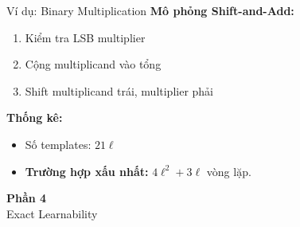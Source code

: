 \begin{frame}{Ví dụ: Binary Multiplication}
  \textbf{Mô phỏng Shift-and-Add:}
  \begin{enumerate}
    \item Kiểm tra LSB multiplier
    \item Cộng multiplicand vào tổng
    \item Shift multiplicand trái, multiplier phải
  \end{enumerate}

  \vspace{0.3cm}
  \textbf{Thống kê:}
  \begin{itemize}
    \item Số templates: $21\ell$
       \item \textbf{Trường hợp xấu nhất:} $4\ell^2 + 3\ell$ vòng lặp.

  \end{itemize}
\end{frame}

\begin{frame}{}
  \centering
  \vfill
  {\Huge \textbf{Phần 4}}\\[0.5cm]
  {\Large Exact Learnability}
  \vfill
\end{frame}
